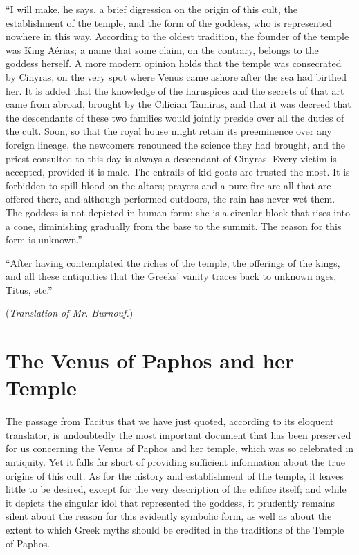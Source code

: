\documentclass[a4paper, 11pt, oneside, polutonikogreek, english]{article}
\begin{document}
``I will make, he says, a brief digression on the origin of this cult, the establishment of the temple, and the form of the goddess, who is represented nowhere in this way. According to the oldest tradition, the founder of the temple was King Aérias; a name that some claim, on the contrary, belongs to the goddess herself. A more modern opinion holds that the temple was consecrated by Cinyras, on the very spot where Venus came ashore after the sea had birthed her. It is added that the knowledge of the haruspices and the secrets of that art came from abroad, brought by the Cilician Tamiras, and that it was decreed that the descendants of these two families would jointly preside over all the duties of the cult. Soon, so that the royal house might retain its preeminence over any foreign lineage, the newcomers renounced the science they had brought, and the priest consulted to this day is always a descendant of Cinyras. Every victim is accepted, provided it is male. The entrails of kid goats are trusted the most. It is forbidden to spill blood on the altars; prayers and a pure fire are all that are offered there, and although performed outdoors, the rain has never wet them. The goddess is not depicted in human form: she is a circular block that rises into a cone, diminishing gradually from the base to the summit. The reason for this form is unknown.''

``After having contemplated the riches of the temple, the offerings of the kings, and all these antiquities that the Greeks' vanity traces back to unknown ages, Titus, etc.''

\bigskip

(\emph{Translation of Mr. Burnouf.})
\clearpage
\section{The Venus of Paphos and her Temple}
\paragraph{}
The passage from Tacitus that we have just quoted, according to its eloquent translator, is undoubtedly the most important document that has been preserved for us concerning the Venus of Paphos and her temple, which was so celebrated in antiquity. Yet it falls far short of providing sufficient information about the true origins of this cult. As for the history and establishment of the temple, it leaves little to be desired, except for the very description of the edifice itself; and while it depicts the singular idol that represented the goddess, it prudently remains silent about the reason for this evidently symbolic form, as well as about the extent to which Greek myths should be credited in the traditions of the Temple of Paphos.
\end{document}
